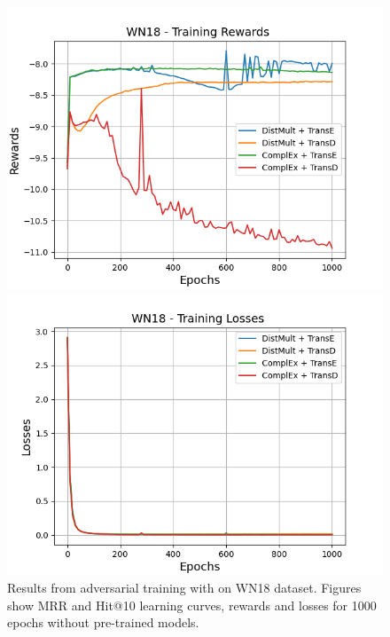 \begin{figure}[H]
    \begin{minipage}{.5\textwidth}
      \centering
      \includegraphics[width=\linewidth]{figures/results/gan_train/not_pretrained/uncertainty/max/entropy/wn18/1k_epochs/uncertainty_wn18_rew.png}
    \end{minipage}%
     \begin{minipage}{.5\textwidth}
      \centering
      \includegraphics[width=\linewidth]{figures/results/gan_train/not_pretrained/uncertainty/max/entropy/wn18/1k_epochs/uncertainty_wn18_losses.png}
    \end{minipage}%
    \caption{Results from adversarial training with \usmax on \textsc{WN18} dataset.
    Figures show MRR and Hit@10 learning curves, rewards and losses for 1000 epochs without pre-trained models.}
    \label{fig:gan_train_not_pretrained_usmax_wn18}
\end{figure}
